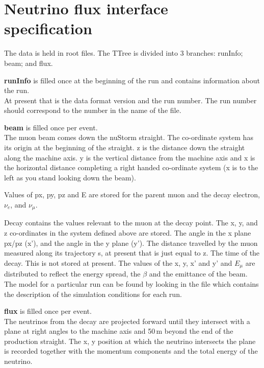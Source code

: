 \section{Neutrino flux interface specification}
The data is held in root files. 
The TTree is divided into 3 branches: runInfo; beam; and flux.
\begin{description}
  \item {\bf runInfo} is filled once at the beginning of the run and
    contains information about the run.  \\
    At present that is the data format version and the run number. The
    run number should correspond to the number in the name of the
    file.
  \item {\bf beam} is  filled once per event. \\
    The muon beam comes down the nuStorm straight.
    The co-ordinate system has its origin at the beginning of the 
    straight.
    z is the distance down the straight along the machine axis.
    y is the vertical distance from the machine axis and x is the
    horizontal distance completing a right handed co-ordinate system
    (x is to the left as you stand looking down the beam).

    Values of px, py, pz and E are stored for the parent muon and the 
    decay electron, $\nu_{e}$, and $\nu_{\mu}$.

    Decay contains the values relevant to the muon at the decay
    point.
    The x, y, and z co-ordinates in the system defined above are
    stored.
    The angle in the x plane px/pz  (x'), and the angle in the y plane
    (y').
    The distance travelled by the muon measured along its trajectory
    s, at present that is just equal to z.
    The time of the decay.
    This is not stored at present.
    The values of the x, y, x' and y' and $E_{\mu}$ are distributed to
    reflect the energy spread, the $\beta$ and the emittance of the
    beam.
    The model for a particular run can be found by looking in the file
    which contains the description of the simulation conditions for
    each run.
  \item {\bf flux} is  filled once per event. \\
    The neutrinos from the decay are projected forward until they
    intersect with a plane at right angles to the machine axis and
    50\,m beyond the end of the production straight.
    The x, y position at which the neutrino intersects the plane is
    recorded together with the momentum components and the total
    energy of the neutrino.
\end{description}

